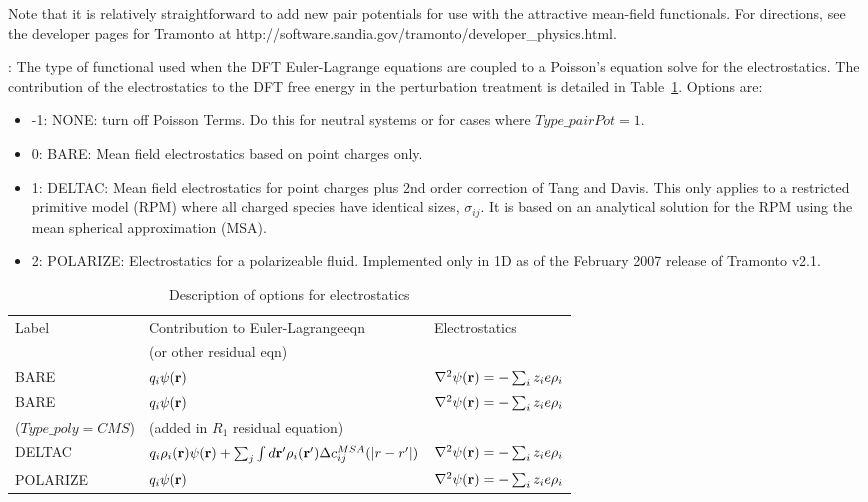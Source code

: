 \documentclass[10pt,onecolumn]{article}
\begin{document}
\noindent Note that it is relatively straightforward to add new pair potentials for use with the attractive mean-field functionals.  For directions, see the developer pages for Tramonto at http://software.sandia.gov/tramonto/developer\_physics.html.  


\vfill
\break

\noindent\dotfill


\vspace{0.1in}
: The type of functional
used when the DFT Euler-Lagrange equations are coupled to a
Poisson's equation solve for the electrostatics.  
The contribution of the electrostatics to the DFT free energy in the perturbation treatment is detailed in Table~\ref{tab:funcelec}.  Options are:
\begin{itemize}
\item{-1: NONE: turn off Poisson Terms.  Do this for neutral systems or for cases where 
$Type\_pairPot=1$.}
\item{0: BARE: Mean field electrostatics based on point charges only.}
\item{1: DELTAC: Mean field electrostatics for point charges plus 2nd order correction of Tang and Davis.
This only applies to a restricted primitive model (RPM) where all charged species have identical
sizes, $\sigma_{ij}$.  It is based on an analytical solution for the RPM using the mean spherical
approximation (MSA).}
\item{2: POLARIZE: Electrostatics for a polarizeable fluid.  Implemented only in 1D as of the 
February 2007 release of Tramonto v2.1.}
\end{itemize}

\begin{table}[h]
\center\begin{tabular}{|l|l|l|} \hline
Label & Contribution to Euler-Lagrangeeqn & Electrostatics \\ 
          &  (or other residual eqn) & \\ \hline
BARE & $q_i \psi({\bf r})$ &
$\nabla^2\psi({\bf r})=-\sum_i z_i e\rho_i$ \\ \hline
BARE & $q_i \psi({\bf r})$ &
$\nabla^2\psi({\bf r})=-\sum_i z_i e\rho_i$ \\ 
 ($Type\_poly=CMS$)   & (added in $R_1$ residual equation) & \\ \hline 
DELTAC & $ q_i \rho_i({\bf r})\psi({\bf r})+\sum_j \int {d{\bf r'}}\rho_i({\bf r'}) \Delta c^{MSA}_{ij}(|r-r'|)$ &
$\nabla^2\psi({\bf r})=-\sum_i z_i e\rho_i$ \\ \hline
POLARIZE &  $q_i \psi({\bf r})$ &
$\nabla^2\psi({\bf r})=-\sum_i z_i e\rho_i$ \\ \hline
 \end{tabular}
\caption{Description of options for electrostatics}
\label{tab:funcelec}
\end{table}
\end{document}
